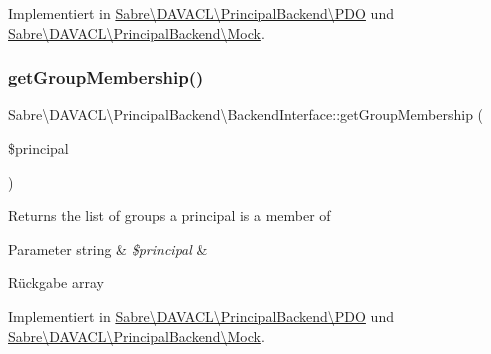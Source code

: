 Implementiert in \mbox{\hyperlink{class_sabre_1_1_d_a_v_a_c_l_1_1_principal_backend_1_1_p_d_o_a5efafea05ba269b5482c7cbf1f0d5423}{Sabre\textbackslash{}\+D\+A\+V\+A\+C\+L\textbackslash{}\+Principal\+Backend\textbackslash{}\+P\+DO}} und \mbox{\hyperlink{class_sabre_1_1_d_a_v_a_c_l_1_1_principal_backend_1_1_mock_aca5c8ecd08f460c7144ec921d35bea0b}{Sabre\textbackslash{}\+D\+A\+V\+A\+C\+L\textbackslash{}\+Principal\+Backend\textbackslash{}\+Mock}}.

\mbox{\label{interface_sabre_1_1_d_a_v_a_c_l_1_1_principal_backend_1_1_backend_interface_ac57affc7cfeb292c4262bd555953c372}} 
\subsubsection{\texorpdfstring{get\+Group\+Membership()}{getGroupMembership()}}
{\footnotesize\ttfamily Sabre\textbackslash{}\+D\+A\+V\+A\+C\+L\textbackslash{}\+Principal\+Backend\textbackslash{}\+Backend\+Interface\+::get\+Group\+Membership (\begin{DoxyParamCaption}\item[{}]{\$principal }\end{DoxyParamCaption})}

Returns the list of groups a principal is a member of


\begin{DoxyParams}[1]{Parameter}
string & {\em \$principal} & \\
\hline
\end{DoxyParams}
\begin{DoxyReturn}{Rückgabe}
array 
\end{DoxyReturn}


Implementiert in \mbox{\hyperlink{class_sabre_1_1_d_a_v_a_c_l_1_1_principal_backend_1_1_p_d_o_af19a397542ae2ed37d9108fb887139e6}{Sabre\textbackslash{}\+D\+A\+V\+A\+C\+L\textbackslash{}\+Principal\+Backend\textbackslash{}\+P\+DO}} und \mbox{\hyperlink{class_sabre_1_1_d_a_v_a_c_l_1_1_principal_backend_1_1_mock_a1de134b0b7f9c1e2e04bffb7c355a60f}{Sabre\textbackslash{}\+D\+A\+V\+A\+C\+L\textbackslash{}\+Principal\+Backend\textbackslash{}\+Mock}}.


